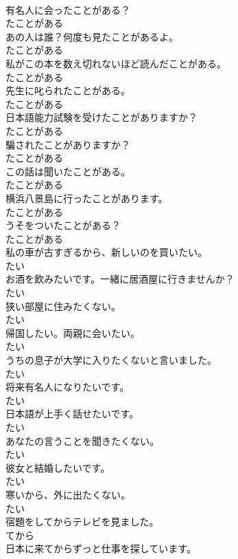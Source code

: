 \documentclass[8pt]{extreport}
\begin{document}
\begin{CJK}{UTF8}{min}
\\	有名人に会ったことがある？	
\\	たことがある
\\	あの人は誰？何度も見たことがあるよ。	
\\	たことがある
\\	私がこの本を数え切れないほど読んだことがある。	
\\	たことがある
\\	先生に叱られたことがある。	
\\	たことがある
\\	日本語能力試験を受けたことがありますか？	
\\	たことがある
\\	騙されたことがありますか？	
\\	たことがある
\\	この話は聞いたことがある。	
\\	たことがある
\\	横浜八景島に行ったことがあります。	
\\	たことがある
\\	うそをついたことがある？	
\\	たことがある
\\	私の車が古すぎるから、新しいのを買いたい。	
\\	たい
\\	お酒を飲みたいです。一緒に居酒屋に行きませんか？	
\\	たい
\\	狭い部屋に住みたくない。	
\\	たい
\\	帰国したい。両親に会いたい。	
\\	たい
\\	うちの息子が大学に入りたくないと言いました。	
\\	たい
\\	将来有名人になりたいです。	
\\	たい
\\	日本語が上手く話せたいです。	
\\	たい
\\	あなたの言うことを聞きたくない。	
\\	たい
\\	彼女と結婚したいです。	
\\	たい
\\	寒いから、外に出たくない。	
\\	たい
\\	宿題をしてからテレビを見ました。	
\\	てから
\\	日本に来てからずっと仕事を探しています。	

\end{CJK}
\end{document}
